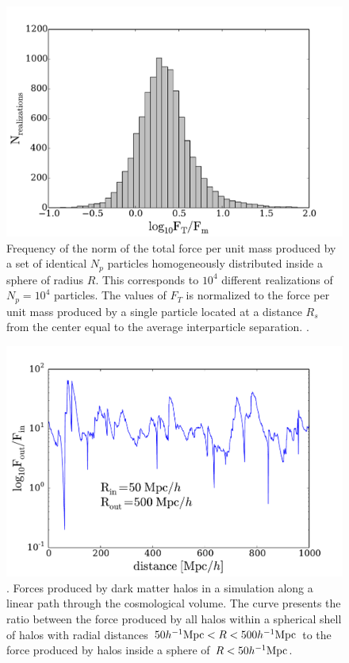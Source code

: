 \documentclass{article}
\newcommand{\hMpc}{{\ifmmode{h^{-1}{\rm Mpc}}\else{$h^{-1}$Mpc }\fi}}
\begin{document}
\begin{figure}
\begin{center}
\includegraphics[width=0.8\linewidth,angle=0]{spheres_bulk.pdf}
\caption{\label{fig:sphere_bulk} Frequency of the norm of the total
  force per unit mass produced by a set of identical $N_p$ particles
  homogeneously distributed inside a sphere of radius $R$. This
  corresponds to $10^4$ different realizations of $N_p=10^4$
  particles. The values of $F_T$ is normalized to the force per unit
  mass produced by a single particle located at a distance $R_s$ from
  the center equal to the average interparticle
  separation. \label{fig:sphere_surface}.}  
\end{center}
\end{figure}




\begin{figure}
\begin{center}
\includegraphics[width=0.8\linewidth,angle=0]{trace_nbody_200_1000.pdf}
\caption{\label{fig:trace_nbody}. Forces produced by dark matter halos in a
simulation along a linear path through the cosmological volume. The
curve presents the ratio between the force produced by all halos
within a spherical shell of halos with radial distances $50\hMpc
<R<500\hMpc$ to the force produced by halos inside 
a sphere of $R<50\hMpc$. }
\end{center}
\end{figure}
\end{document}

